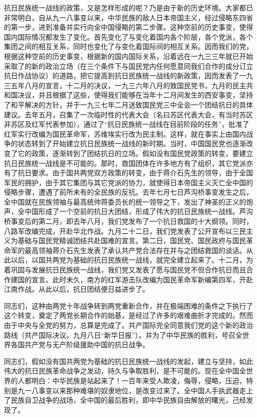 \documentclass[UTF8, 12pt, a4paper]{ctexrep}
\begin{document}
抗日民族统一战线的政策，又是怎样形成的呢？乃是由于新的历史环境。大家都已非常明白，自从九一八事变以来，中华民族的敌人日本帝国主义，经过侵略东四省的第一步，进到准备并实行向全中国侵略的第二步骤。这种空前的历史事变，使得国内国际情况都发生了变化。首先变化了与变化着国内各个阶层，各个党派，各个集团之间的相互关系，同时也变化了与变化着国际间的相互关系。因而我们的党，根据这种空前的历史事变，根据新的国内国际关系，沿着远在一九三三年就已开始采取了的新的政治立场（在三个条件下与国民党内任何愿意同我们合作的成分订立抗日作战协议）的道路，把它提高到抗日民族统一战线的新政策，因而发表了一九三五年八月的宣言，十二月的决议，一九三六年八月的致国民党书，九月的民主共和国决议，并且根据了这些，使得我们能够在当年十二月间发生的西安事变，坚持了和平解决的方针，并于一九三七年二月送致国民党三中全会一个团结抗日的具体建议。去年五月，召集了一次临时性的代表大会（名曰苏区代表大会，有当时苏区非苏区及红军代表参加），通过了“抗日民族统一战线在目前阶段的任务”，批准了红军实行改编为国民革命军，苏维埃实行改为民主制。这样，就在事实上由国内战争的状态转到了开始建立抗日民族统一战线的新时期。当时，中国国民党也逐渐改变了它的政策，逐渐转到了团结抗日的立场。假如没有国民党政策的转变，要建立抗日民族统一战线是不可能的。那时，救国团体在许多地方有了组织，其它党派亦有了抗日要求。由于国共两党双方政策的转变，由于蒋介石先生的领导，由于全国军民的拥护，由于其它集团与其它党派的协力，就使得日本帝国主义灭亡全中国的侵略步骤，遭遇了前所未有的全民族的反抗。去年七月七日芦沟桥事变发生之后，全中国就在民族领袖与最高统帅蒋委员长的统一领导之下，发出了神圣的正义的炮声，全中国形成了一个空前的抗日大团结，形成了伟大的抗日民族统一战线。芦沟桥事变后的第二月，即去年八月，我们党发布了一个抗日救国的十大纲领。同时，八路军改编完成，开赴华北作战。九月二十二日，我们党发表了公开宣布以三民主义为基础与国民党精诚团结共赴国难的宣言。第二日，国民党、国民政府与国民革命军的最高领袖蒋介石先生发表了承认共产党合法存在并与之团结救国的谈话。从此以后，以国共两党为基础的抗日民族统一战线，就完全建立起来了。十二月，为着巩固与发展抗日民族统一战线，我们党又发表了愿与国民党不但合作抗日而且合作建国的宣言。此时未久，南方的红军游击队改编为国民革命军新编第四军，开赴江南作战。从此以后，抗日团结便日益进步了。

同志们，这种由两党十年战争转到两党重新合作，并在极端困难的条件之下执行了这个转变，奠定了两党长期合作的始基，是经过了许多的艰难曲折才完成的。然而由于中央与全党的努力，总算是完成了。共产国际完全同意我们党的这个新的政治路线（共产国际决议，九月八日“新华日报”）。并为了中华民族的胜利，号召全世界各国共产党与无产阶级援助中国的抗日战争。

同志们，假如没有国共两党为基础的抗日民族统一战线的发起，建立与坚持，如此伟大的抗日民族革命战争之发动，持久与争取胜利，是不可能的。现在全中国全世界的人都明白：中华民族是站起来了！一百年来受人欺凌，侮辱，侵略，压迫，特别是九一八事变以来那种难堪的奴隶地位，是改变过来了。全中国人手执武器走上了民族自卫战争的战场，全中国的最后胜利，即中华民族自由解放的曙光，己经发现了。
\end{document}
